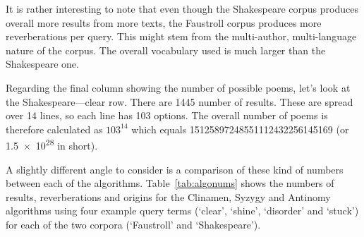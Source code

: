 It is rather interesting to note that even though the Shakespeare corpus produces overall more results from more texts, the Faustroll corpus produces more reverberations per query. This might stem from the multi-author, multi-language nature of the corpus. The overall vocabulary used is much larger than the Shakespeare one.

Regarding the final column showing the number of possible poems, let's look at the Shakespeare---clear row. There are \num{1445} number of results. These are spread over 14 lines, so each line has 103 options. The overall number of poems is therefore calculated as $103^{14}$ which equals \num{15125897248551112432256145169} (or \num{1.5e28} in short).

\spirals

A slightly different angle to consider is a comparison of these kind of numbers between each of the algorithms. Table~\ref{tab:algonums} shows the numbers of results, reverberations and origins for the Clinamen, Syzygy and Antinomy algorithms using four example query terms (`clear', `shine', `disorder' and `stuck') for each of the two corpora (`Faustroll' and `Shakespeare').

